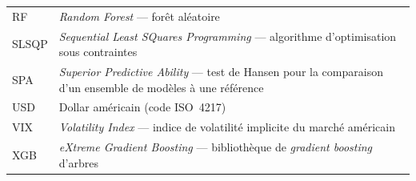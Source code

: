 \begin{longtable}{@{}p{2.6cm}p{11.4cm}@{}}
RF & \emph{Random Forest} — forêt aléatoire \\
SLSQP & \emph{Sequential Least SQuares Programming} — algorithme
d'optimisation sous contraintes \\
SPA & \emph{Superior Predictive Ability} — test de Hansen pour la comparaison
d'un ensemble de modèles à une référence \\
USD & Dollar américain (code ISO~4217) \\
VIX & \emph{Volatility Index} — indice de volatilité implicite du marché
américain \\
XGB & \emph{eXtreme Gradient Boosting} — bibliothèque de \emph{gradient
boosting} d'arbres \\
\bottomrule
\end{longtable}

